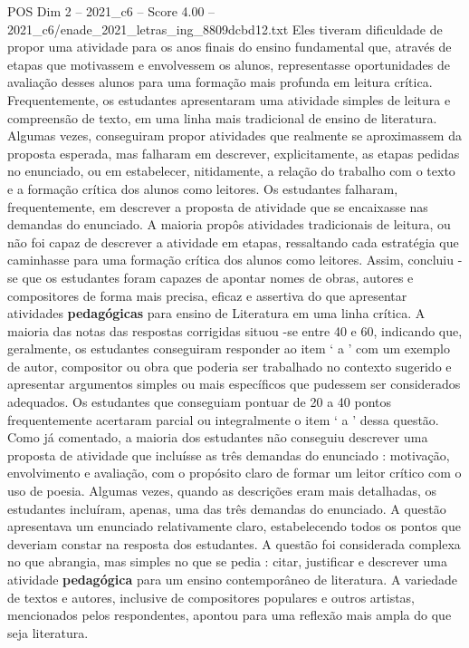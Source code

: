 \begin{textsample}{POS Dim 2 – 2021\_c6 – Score 4.00 – 2021\_c6/enade\_2021\_letras\_ing\_8809dcbd12.txt}
Eles tiveram dificuldade de propor uma atividade para os anos finais do ensino fundamental que, através de etapas que motivassem e envolvessem os alunos, representasse oportunidades de avaliação desses alunos para uma formação mais profunda em leitura crítica.
Frequentemente, os estudantes apresentaram uma atividade simples de leitura e compreensão de texto, em uma linha mais tradicional de ensino de literatura.
Algumas vezes, conseguiram propor atividades que realmente se aproximassem da proposta esperada, mas falharam em descrever, explicitamente, as etapas pedidas no enunciado, ou em estabelecer, nitidamente, a relação do trabalho com o texto e a formação crítica dos alunos como leitores.
Os estudantes falharam, frequentemente, em descrever a proposta de atividade que se encaixasse nas demandas do enunciado.
A maioria propôs atividades tradicionais de leitura, ou não foi capaz de descrever a atividade em etapas, ressaltando cada estratégia que caminhasse para uma formação crítica dos alunos como leitores.
Assim, concluiu -se que os estudantes foram capazes de apontar nomes de obras, autores e compositores de forma mais precisa, eficaz e assertiva do que apresentar atividades \textbf{pedagógicas} para ensino de Literatura em uma linha crítica.
A maioria das notas das respostas corrigidas situou -se entre 40 e 60, indicando que, geralmente, os estudantes conseguiram responder ao item ‘ a ’ com um exemplo de autor, compositor ou obra que poderia ser trabalhado no contexto sugerido e apresentar argumentos simples ou mais específicos que pudessem ser considerados adequados.
Os estudantes que conseguiam pontuar de 20 a 40 pontos frequentemente acertaram parcial ou integralmente o item ‘ a ’ dessa questão.
Como já comentado, a maioria dos estudantes não conseguiu descrever uma proposta de atividade que incluísse as três demandas do enunciado : motivação, envolvimento e avaliação, com o propósito claro de formar um leitor crítico com o uso de poesia.
Algumas vezes, quando as descrições eram mais detalhadas, os estudantes incluíram, apenas, uma das três demandas do enunciado.
A questão apresentava um enunciado relativamente claro, estabelecendo todos os pontos que deveriam constar na resposta dos estudantes.
A questão foi considerada complexa no que abrangia, mas simples no que se pedia : citar, justificar e descrever uma atividade \textbf{pedagógica} para um ensino contemporâneo de literatura.
A variedade de textos e autores, inclusive de compositores populares e outros artistas, mencionados pelos respondentes, apontou para uma reflexão mais ampla do que seja literatura.

\end{textsample}
